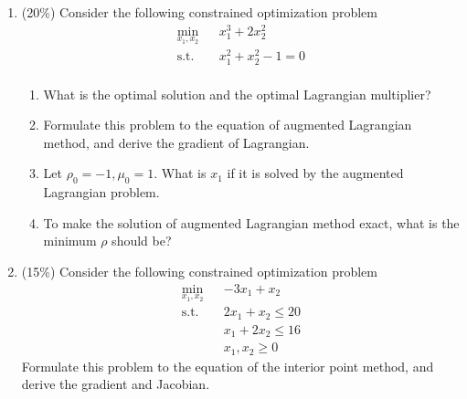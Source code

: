 \documentclass[a4paper,10pt]{article}
\begin{document}
\begin{enumerate}
\item (20\%) Consider the following constrained optimization problem
 \begin{eqnarray*}
   \min_{x_1,x_2} && x_1^3+2x_2^2\\
   \mbox{s.t.} && x_1^2+x_2^2-1=0 \\
 \end{eqnarray*}
\begin{enumerate}
\item What is the optimal solution and the optimal Lagrangian multiplier?
\item Formulate this problem to the equation of augmented Lagrangian method, and derive the gradient of Lagrangian.
\item Let $\rho_0=-1, \mu_0=1$.  What is $x_1$ if it is solved by the augmented Lagrangian problem.
\item To make the solution of augmented Lagrangian method exact, what is the minimum $\rho$ should be?
\end{enumerate}

\item (15\%) Consider the following constrained optimization problem
 \begin{eqnarray*}
   \min_{x_1,x_2} && -3x_1+x_2\\
   \mbox{s.t.} && 2x_1+x_2 \le 20 \\
   					&&  x_1+2x_2 \le 16 \\
   					&& x_1, x_2 \ge 0
 \end{eqnarray*}
Formulate this problem to the equation of the interior point method, and derive the gradient and Jacobian.


\end{enumerate}
\end{document}
